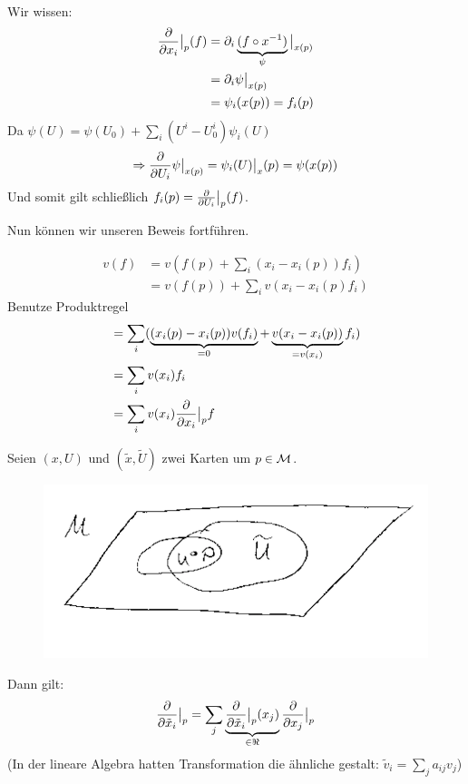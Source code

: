 \begin{bew}
\begin{align}
\end{align}
Wir wissen:
\begin{align}
\pdv{x_i}\big\vert_{p} (f) &= \partial_i \underbrace{(f \circ x^{-1})}_{\psi} \big \vert_{x(p)} \\
&= \partial_i \psi \big\vert_{x(p)}\\
&= \psi_i (x(p)) = f_i (p)
\end{align}
Da $\psi(U) = \psi(U_0) + \sum_i (U^i - U^i_0)\psi_i(U)$
\begin{align}
\Rightarrow \pdv{U_i} \psi \big\vert_{x(p)} = \psi_i(U) \big\vert_x(p) = \psi(x(p))
\end{align}
Und somit gilt schließlich $f_i (p) = \pdv{U_i} \big\vert_p (f)$.
\end{bew}

Nun können wir unseren Beweis fortführen.

\begin{bew} \leavevmode
\begin{align}
v(f) &= v(f(p) + \sum_i (x_i - x_i(p)) f_i) \\
&= v(f(p)) + \sum_i v(x_i - x_i (p) f_i)
\end{align}
Benutze Produktregel
\begin{align}
&= \sum_i (\underbrace{(x_i (p) - x_i (p)) v(f_i)}_{=0} + \underbrace{v(x_i - x_i (p))}_{=v(x_i)} f_i) \\
&= \sum_i v(x_i) f_i \\
&= \sum_i v(x_i) \pdv{x_i} \big\vert_p f 
\end{align}
\end{bew}


\begin{satz}[Transformationsregel]
Seien $(x, U)$ und $(\tilde{x}, \tilde{U})$ zwei Karten um $p \in \mathcal{M}$. 
\begin{figure}[h]
\centering
\includegraphics[width=0.5\linewidth]{figures/scan/transformationsregel.png}
\label{img:transformationsregel}
\end{figure} 
Dann gilt:
\begin{align}
\pdv{\tilde{x}_i} \big\vert_p  = \sum_j \underbrace{\pdv{\tilde{x}_i} \big\vert_p  (x_j)}_{\in \real} \pdv{x_j} \big\vert_p 
\end{align}
(In der lineare Algebra hatten Transformation die ähnliche gestalt: $\tilde{v}_i = \sum_j a_{i j } v_j$)
\end{satz}


